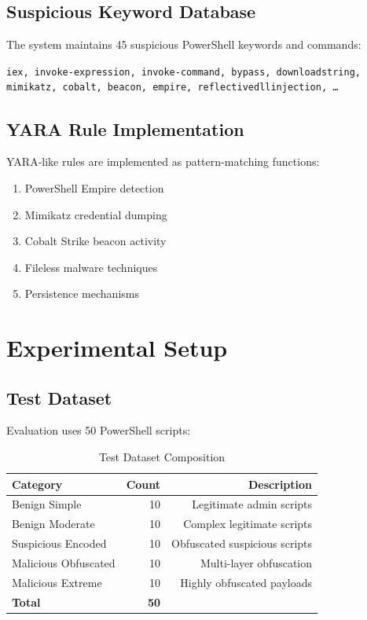 \documentclass[10pt,conference,a4paper]{IEEEtran}
\begin{document}
\subsection{Suspicious Keyword Database}

The system maintains 45 suspicious PowerShell keywords and commands:

\texttt{iex, invoke-expression, invoke-command, bypass, downloadstring, mimikatz, cobalt, beacon, empire, reflectivedllinjection, \ldots}

\subsection{YARA Rule Implementation}

YARA-like rules are implemented as pattern-matching functions:

\begin{enumerate}
\item PowerShell Empire detection
\item Mimikatz credential dumping
\item Cobalt Strike beacon activity
\item Fileless malware techniques
\item Persistence mechanisms
\end{enumerate}

\section{Experimental Setup}

\subsection{Test Dataset}

Evaluation uses 50 PowerShell scripts:

\begin{table}[H]
\centering
\small
\begin{tabular}{|l|r|r|}
\hline
\textbf{Category} & \textbf{Count} & \textbf{Description} \\
\hline
Benign Simple & 10 & Legitimate admin scripts \\
Benign Moderate & 10 & Complex legitimate scripts \\
Suspicious Encoded & 10 & Obfuscated suspicious scripts \\
Malicious Obfuscated & 10 & Multi-layer obfuscation \\
Malicious Extreme & 10 & Highly obfuscated payloads \\
\hline
\textbf{Total} & \textbf{50} & \\
\hline
\end{tabular}
\caption{Test Dataset Composition}
\label{tab:dataset}
\end{table}
\end{document}

